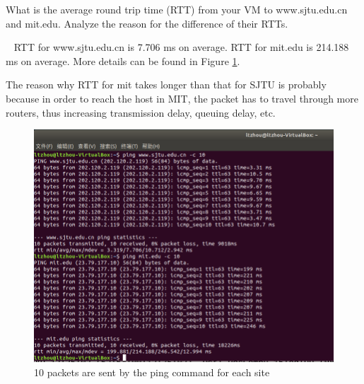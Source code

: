 \begin{exercise}[]{What is the average round trip time (RTT) from your VM to www.sjtu.edu.cn and mit.edu.
    Analyze the reason for the difference of their RTTs.}
  \begin{solution}
  \par{~}
  RTT for www.sjtu.edu.cn is 7.706 ms on average. RTT for mit.edu is 214.188 ms on average. More details can be found in Figure \ref{fig:ex3}.

  The reason why RTT for mit takes longer than that for SJTU is probably because in order to reach the host in MIT, the packet has to travel through more routers, thus increasing transmission delay, queuing delay, etc.

  \begin{figure}[hb]
    \begin{center}
    \includegraphics[width=12cm]{img/lab1/ex3}
    \caption{10 packets are sent by the ping command for each site}
    \label{fig:ex3}
    \end{center}
  \end{figure}
  \end{solution}
  \label{ex3}
\end{exercise}


